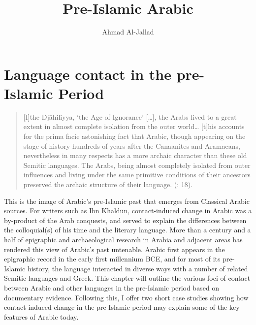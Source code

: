 \documentclass[output=paper]{langsci/langscibook}
\author{Ahmad Al-Jallad\affiliation{The Ohio State University}}
\title{Pre-Islamic Arabic}
\begin{document}
  
\section{Language contact in the pre-Islamic Period}

\begin{quote}
[I]the Djāhiliyya, ‘the Age of Ignorance’ […], the Arabs lived to a great extent in almost complete isolation from the outer world… [t]his accounts for the prima facie astonishing fact that Arabic, though appearing on the stage of history hundreds of years after the Canaanites and Aramaeans, nevertheless in many respects has a more archaic character than these old Semitic languages. The Arabs, being almost completely isolated from outer influences and living under the same primitive conditions of their ancestors preserved the archaic structure of their language. (\citealt{Blau1981}: 18).
\end{quote}
This is the image of Arabic’s pre-Islamic past that emerges from Classical Arabic sources. For writers such as Ibn Khaldūn, contact-induced change in Arabic was a by-product of the Arab conquests, and served to explain the differences between the colloquial(s) of his time and the literary language. More than a century and a half of epigraphic and archaeological research in Arabia and adjacent areas has rendered this view of Arabic’s past untenable. Arabic first appears in the epigraphic record in the early first millennium BCE, and for most of its pre-Islamic history, the language interacted in diverse ways with a number of related Semitic languages and Greek. This chapter will outline the various foci of contact between Arabic and other languages in the pre-Islamic period based on documentary evidence. Following this, I offer two short case studies showing how contact-induced change in the pre-Islamic period may explain some of the key features of Arabic today.   
\end{document}
